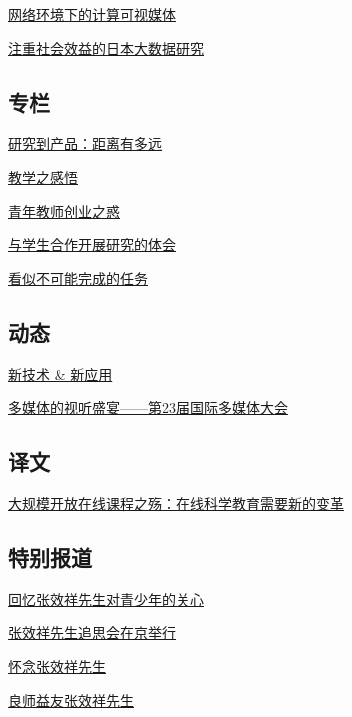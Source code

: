 \documentclass[a4paper]{article}
\begin{document}
\href{http://history.ccf.org.cn/resources/1190201776262/2015/12/11/17.pdf}{网络环境下的计算可视媒体}

\href{http://history.ccf.org.cn/resources/1190201776262/2015/12/11/14.pdf}{注重社会效益的日本大数据研究}

\subsection{专栏}
\href{http://history.ccf.org.cn/resources/1190201776262/2015/12/11/20.pdf}{研究到产品：距离有多远}

\href{http://history.ccf.org.cn/resources/1190201776262/2015/12/11/21.pdf}{教学之感悟}

\href{http://history.ccf.org.cn/resources/1190201776262/2015/12/11/22.pdf}{青年教师创业之惑}

\href{http://history.ccf.org.cn/resources/1190201776262/2015/12/11/19.pdf}{与学生合作开展研究的体会}

\href{http://history.ccf.org.cn/resources/1190201776262/2015/12/11/23.pdf}{看似不可能完成的任务}

\subsection{动态}
\href{http://history.ccf.org.cn/resources/1190201776262/2015/12/11/25.pdf}{新技术 \& 新应用}

\href{http://history.ccf.org.cn/resources/1190201776262/2015/12/11/24.pdf}{多媒体的视听盛宴——第23届国际多媒体大会}

\subsection{译文}
\href{http://history.ccf.org.cn/resources/1190201776262/2015/12/11/26.pdf}{大规模开放在线课程之殇：在线科学教育需要新的变革}

\subsection{特别报道}
\href{http://history.ccf.org.cn/resources/1190201776262/2015/12/11/10.pdf}{回忆张效祥先生对青少年的关心}

\href{http://history.ccf.org.cn/resources/1190201776262/2015/12/11/1.pdf}{张效祥先生追思会在京举行}

\href{http://history.ccf.org.cn/resources/1190201776262/2015/12/11/4.pdf}{怀念张效祥先生}

\href{http://history.ccf.org.cn/resources/1190201776262/2015/12/11/8.pdf}{良师益友张效祥先生}
\end{document}

